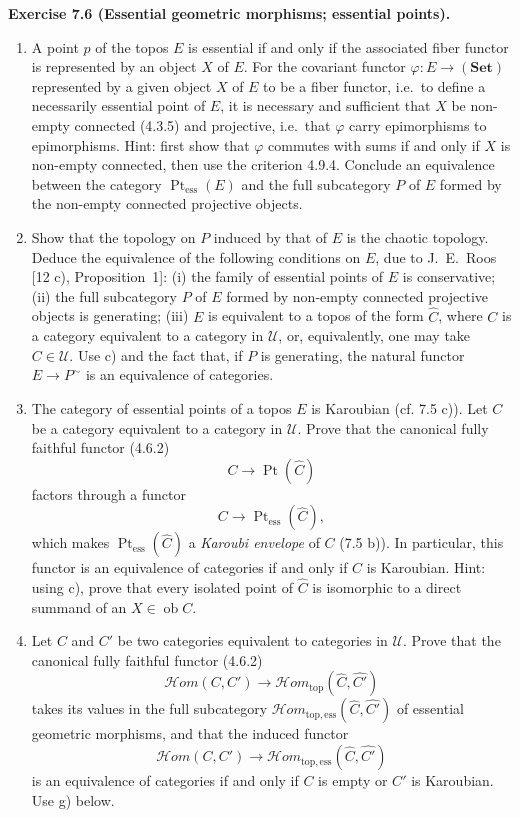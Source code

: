 \documentclass[11pt]{article}
\newcommand{\U}{\mathcal{U}}
\newcommand{\Set}{\mathbf{Set}}
\newcommand{\ob}{\operatorname{ob}}
\newcommand{\Ppoint}{\operatorname{Pt}}
\newcommand{\Ppointess}{\operatorname{Pt}_{\mathrm{ess}}}
\newcommand{\Hhom}{\mathcal{H}om}
\newcommand{\Hhomtop}{\mathcal{H}om_{\mathrm{top}}}
\newcommand{\Hhomtopess}{\mathcal{H}om_{\mathrm{top},\mathrm{ess}}}
\newcommand{\ie}{i.e.}
\newenvironment{remarktext}[1]{\par\medskip\noindent\textbf{#1.}\ }{\par\medskip}
\begin{document}
\begin{remarktext}{Exercise 7.6 (Essential geometric morphisms; essential points)}
\begin{enumerate}[label=\alph*)]
\item A point \(p\) of the topos \(E\) is essential if and only if the associated fiber functor is represented by an object \(X\) of \(E\). For the covariant functor \(\varphi:E\to(\Set)\) represented by a given object \(X\) of \(E\) to be a fiber functor, \ie\ to define a necessarily essential point of \(E\), it is necessary and sufficient that \(X\) be non-empty connected (4.3.5) and projective, \ie\ that \(\varphi\) carry epimorphisms to epimorphisms. Hint: first show that \(\varphi\) commutes with sums if and only if \(X\) is non-empty connected, then use the criterion 4.9.4. Conclude an equivalence between the category \(\Ppointess(E)\) and the full subcategory \(P\) of \(E\) formed by the non-empty connected projective objects.

\item Show that the topology on \(P\) induced by that of \(E\) is the chaotic topology. Deduce the equivalence of the following conditions on \(E\), due to J.~E.~Roos [12 c), Proposition~1]: (i) the family of essential points of \(E\) is conservative; (ii) the full subcategory \(P\) of \(E\) formed by non-empty connected projective objects is generating; (iii) \(E\) is equivalent to a topos of the form \(\widehat C\), where \(C\) is a category equivalent to a category in \(\U\), or, equivalently, one may take \(C\in\U\). Use c) and the fact that, if \(P\) is generating, the natural functor \(E\to P^{\sim}\) is an equivalence of categories.

\item The category of essential points of a topos \(E\) is Karoubian (cf. 7.5 c)). Let \(C\) be a category equivalent to a category in \(\U\). Prove that the canonical fully faithful functor (4.6.2)
\[
C\longrightarrow\Ppoint(\widehat C)
\]
factors through a functor
\[
C\longrightarrow\Ppointess(\widehat C),
\]
which makes \(\Ppointess(\widehat C)\) a \emph{Karoubi envelope} of \(C\) (7.5 b)). In particular, this functor is an equivalence of categories if and only if \(C\) is Karoubian. Hint: using c), prove that every isolated point of \(\widehat C\) is isomorphic to a direct summand of an \(X\in\ob C\).

\item Let \(C\) and \(C'\) be two categories equivalent to categories in \(\U\). Prove that the canonical fully faithful functor (4.6.2)
\[
\Hhom(C,C')\longrightarrow\Hhomtop(\widehat C,\widehat{C'})
\]
takes its values in the full subcategory \(\Hhomtopess(\widehat C,\widehat{C'})\) of essential geometric morphisms, and that the induced functor
\[
\Hhom(C,C')\longrightarrow\Hhomtopess(\widehat C,\widehat{C'})
\]
is an equivalence of categories if and only if \(C\) is empty or \(C'\) is Karoubian. Use g) below.


\end{enumerate}
\end{remarktext}
\end{document}
